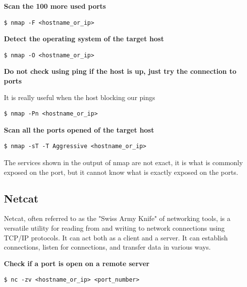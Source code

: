 \documentclass{article}
\newenvironment{blocktemplateII}[1]{%
    \tcolorbox[beamer,%
    noparskip,breakable,
    colframe=Green,%
    colbacklower=LimeGreen!75!LightGreen,%
    title=#1]}%
    {\endtcolorbox}
\newenvironment{codetemplate}[1][]{%
  \mybasecolorbox[#1]
  \itshape
}{%
  \endmybasecolorbox
}
\begin{document}
\textbf{Scan the 100 more used ports}
\begin{codetemplate}{}
\begin{verbatim}
$ nmap -F <hostname_or_ip>
\end{verbatim}
\end{codetemplate}

\textbf{Detect the operating system of the target host}
\begin{codetemplate}{}
\begin{verbatim}
$ nmap -O <hostname_or_ip>
\end{verbatim}
\end{codetemplate}

\textbf{Do not check using ping if the host is up, just try the connection to ports}

It is really useful when the host blocking our pings
\begin{codetemplate}{}
\begin{verbatim}
$ nmap -Pn <hostname_or_ip>
\end{verbatim}
\end{codetemplate}

\textbf{Scan all the ports opened of the target host}
\begin{codetemplate}{}
\begin{verbatim}
$ nmap -sT -T Aggressive <hostname_or_ip>
\end{verbatim}
\end{codetemplate}

\begin{blocktemplateII}{NOTE}
The services shown in the output of nmap are not exact, it is what is commonly exposed on the port, but it cannot know what is exactly exposed on the ports.
\end{blocktemplateII}

\subsection{Netcat}

Netcat, often referred to as the "Swiss Army Knife" of networking tools, is a versatile utility for reading from and writing to network connections using TCP/IP protocols. It can act both as a client and a server. It can establish connections, listen for connections, and transfer data in various ways.

\textbf{Check if a port is open on a remote server}
\begin{codetemplate}
\begin{verbatim}
$ nc -zv <hostname_or_ip> <port_number>
\end{verbatim}
\end{codetemplate}
\end{document}
